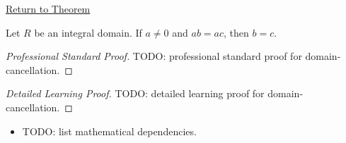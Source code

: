 \newpage
{}
\label{prf:domain-cancellation}

\begin{remark*}[Return]
\hyperref[prop:domain-cancellation]{Return to Theorem}
\end{remark*}

\begin{theorem*}
Let $R$ be an integral domain.  If $a\neq 0$ and $ab=ac$, then $b=c$.
\end{theorem*}

\begin{proof}[Professional Standard Proof]
\LRAProofBodyStart
TODO: professional standard proof for domain-cancellation.
\end{proof}

\begin{proof}[Detailed Learning Proof]
\LRAProofBodyStart
TODO: detailed learning proof for domain-cancellation.
\end{proof}

\begin{remark*}
\end{remark*}

\begin{dependencies}
\begin{itemize}
  \item TODO: list mathematical dependencies.
\end{itemize}
\end{dependencies}

\clearpage
